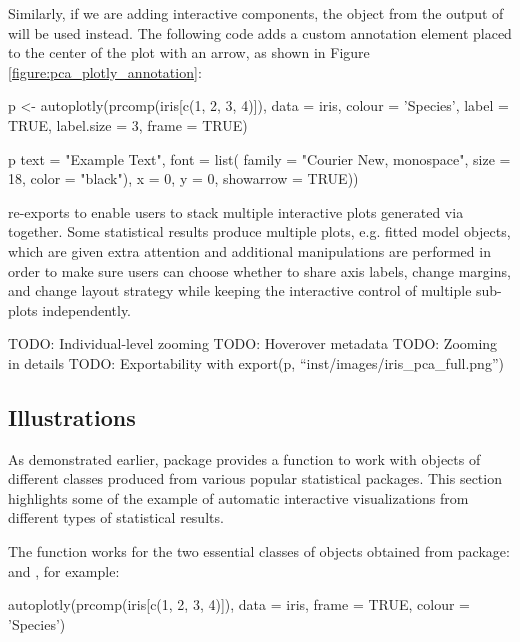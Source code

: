 Similarly, if we are adding  interactive components, the
 object from the output of  
will be used instead. The following code adds a custom 
annotation element placed to the center of the plot with an arrow, as
shown in Figure \ref{figure:pca_plotly_annotation}:

\begin{Schunk}
\begin{Sinput}
p <- autoplotly(prcomp(iris[c(1, 2, 3, 4)]), data = iris,
  colour = 'Species', label = TRUE, label.size = 3, frame = TRUE)

p %
  text = "Example Text",
  font = list(
    family = "Courier New, monospace",
    size = 18,
    color = "black"),
  x = 0,
  y = 0,
  showarrow = TRUE))
\end{Sinput}
\end{Schunk}

 re-exports  to enable users to
stack multiple interactive plots generated via 
together. Some statistical results produce multiple plots, e.g.
 fitted model objects, which are given extra attention and
additional manipulations are performed in order to make sure users can
choose whether to share axis labels, change margins, and change layout
strategy while keeping the interactive control of multiple sub-plots
independently.

TODO: Individual-level zooming TODO: Hoverover metadata TODO: Zooming in
details TODO: Exportability with export(p,
``inst/images/iris\_pca\_full.png'')

\subsection{Illustrations}\label{illustrations}

As demonstrated earlier,  package provides a
 function to work with objects of different classes
produced from various popular statistical packages. This section
highlights some of the example of automatic interactive visualizations
from different types of statistical results.

The  function works for the two essential classes of
objects obtained from  package:  and
, for example:

\begin{Schunk}
\begin{Sinput}
autoplotly(prcomp(iris[c(1, 2, 3, 4)]), data = iris, frame = TRUE, colour = 'Species')
\end{Sinput}
\end{Schunk}

